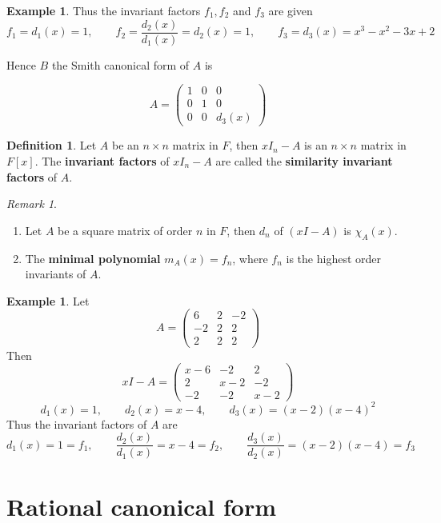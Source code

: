 \documentclass{article}
\theoremstyle{definition}
\newtheorem{defn}[thm]{Definition}
\newtheorem{exmp}[thm]{Example}
\theoremstyle{remark}
\newtheorem{rem}[thm]{Remark}
\begin{document}
\begin{exmp}
Thus the invariant factors $f_1,f_2$ and $f_3$ are given
$$f_1=d_1(x)=1, \qquad f_2=\frac{d_2(x)}{d_1(x)}=d_2(x)=1, \qquad f_3=d_3(x)=x^3-x^2-3x+2$$

Hence $B$ the Smith canonical form of $A$ is

$$
  A= \left(
    \begin{matrix}
      1 & 0 & 0 \\
      0 & 1 & 0 \\
      0 & 0 & d_3(x)
    \end{matrix}
    \right)
$$
\end{exmp}

\begin{defn}
Let $A$ be an $n\times n$ matrix in $F$, then $xI_n-A$ is an $n\times n$ matrix in $F[x]$. The \textbf{invariant factors} of $xI_n-A$ are called the \textbf{similarity invariant factors} of $A$.
\end{defn}

\begin{rem}
\begin{enumerate}
  \item Let $A$ be a square matrix of order $n$ in $F$, then $d_n$ of $(xI-A)$ is $\chi_A(x)$.
  \item The \textbf{minimal polynomial} $m_A(x)=f_n$, where $f_n$ is the highest order invariants of $A$.
\end{enumerate}
\end{rem}

\begin{exmp}\label{example2}
Let
$$
  A= \left(
    \begin{matrix}
      6 & 2 & -2 \\
      -2 & 2 & 2 \\
      2 & 2 & 2
    \end{matrix}
    \right)
$$
Then
$$
  xI-A= \left(
    \begin{matrix}
      x-6 & -2 & 2 \\
      2 & x-2 & -2 \\
      -2 & -2 & x-2
    \end{matrix}
    \right)
$$
$$d_1(x)=1, \qquad d_2(x)=x-4, \qquad d_3(x)=(x-2)(x-4)^2$$
Thus the invariant factors of $A$ are
$$d_1(x)=1=f_1,\qquad \frac{d_2(x)}{d_1(x)}=x-4=f_2, \qquad \frac{d_3(x)}{d_2(x)}=(x-2)(x-4)=f_3$$
\end{exmp}

\section{Rational canonical form}
\end{document}
